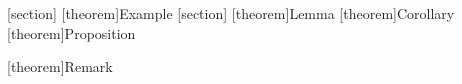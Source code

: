 \graphicspath{ {./Figures/} }

\captionsetup{labelsep=space,labelfont=bf}
\renewcommand{\thefigure}{\arabic{chapter}.\arabic{figure}}
\renewcommand{\thetable}{\arabic{chapter}.\arabic{table}}

\theorembodyfont{\upshape}
[section]
[theorem]{Example}
\theorembodyfont{\itshape}
[section]
[theorem]{Lemma}
[theorem]{Corollary}
[theorem]{Proposition}
\newtheorem{assumption}{A\hspace{-4 pt}}
[theorem]{Remark}

